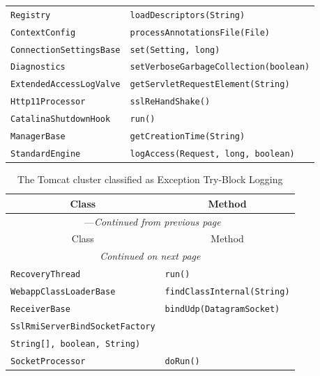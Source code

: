 \begin{center}
\begin{longtable}{ll}
\lstinline/Registry/&{\lstinline/loadDescriptors(String)/}\\
\lstinline/ContextConfig/&{\lstinline/processAnnotationsFile(File)/}\\
\lstinline/ConnectionSettingsBase/&{\lstinline/set(Setting, long)/}\\
\lstinline/Diagnostics/&{\lstinline/setVerboseGarbageCollection(boolean)/}\\
\lstinline/ExtendedAccessLogValve/&{\lstinline/getServletRequestElement(String)/}\\
\lstinline/Http11Processor/&{\lstinline/sslReHandShake()/}\\
\lstinline/CatalinaShutdownHook/&{\lstinline/run()/}\\
\lstinline/ManagerBase/&{\lstinline/getCreationTime(String)/}\\
\lstinline/StandardEngine/&{\lstinline/logAccess(Request, long, boolean)/}\\
\end{longtable}
\end{center}

\begin{center}
\begin{longtable}{ll}
\caption{The Tomcat cluster classified as Exception Try-Block Logging}\\
\toprule\multicolumn{1}{c}{Class}&\multicolumn{1}{c}{Method}\\\midrule
\endfirsthead

\multicolumn{2}{c}{\tablename\ \thetable{}---\textit{Continued from previous page}} \\\midrule
\multicolumn{1}{c}{Class}&\multicolumn{1}{c}{Method}\\\midrule
\endhead
\multicolumn{2}{c}{\textit{Continued on next page}}\\\midrule
\endfoot
\bottomrule
\endlastfoot

\lstinline/RecoveryThread/&{\lstinline/run()/}\\
\lstinline/WebappClassLoaderBase/&{\lstinline/findClassInternal(String)/}\\
\lstinline/ReceiverBase/&{\lstinline/bindUdp(DatagramSocket)/}\\
\lstinline/SslRmiServerBindSocketFactory/&\raisebox{-13pt}{\shortstack{\lstinline/SslRmiServerBindSocketFactory(String[],/\\\lstinline/String[], boolean, String)/}}\\
\lstinline/SocketProcessor/&{\lstinline/doRun()/}\\
\end{longtable}
\end{center}
\newpage

